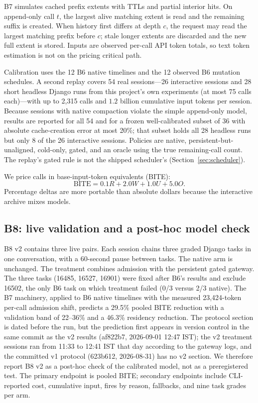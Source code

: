 \documentclass[10pt,twocolumn]{article}
\begin{document}
B7 simulates cached prefix extents with TTLs and partial interior hits.  On append-only call $t$, the
largest alive matching extent is read and the remaining suffix is created.  When history first differs
at depth $c$, the request may read the largest matching prefix before $c$; stale longer extents are
discarded and the new full extent is stored.  Inputs are observed per-call API token totals, so text
token estimation is not on the pricing critical path.

Calibration uses the 12 B6 native timelines and the 12 observed B6 mutation schedules.  A second
replay covers 54 real sessions---26 interactive sessions and 28 short headless Django runs from this
project's own experiments (at most 75 calls each)---with up to 2,315 calls and $1.2$ billion cumulative
input tokens per session.  Because sessions with native compaction violate the simple append-only model,
results are reported for all 54 and for a frozen well-calibrated subset of 36 with absolute
cache-creation error at most 20\%; that subset holds all 28 headless runs but only 8 of the 26
interactive sessions.  Policies are native, persistent-but-unaligned, cold-only, gated, and an oracle
using the true remaining-call count.  The replay's gated rule is not the shipped scheduler's
(Section~\ref{sec:scheduler}).

We price calls in base-input-token equivalents (BITE):
\begin{equation}
\mathrm{BITE}=0.1R+2.0W+1.0U+5.0O.
\end{equation}
Percentage deltas are more portable than absolute dollars because the interactive archive mixes
models.

\subsection{B8: live validation and a post-hoc model check}
\label{sec:b8method}

B8 v2 contains three live pairs.  Each session chains three graded Django tasks in one conversation,
with a 60-second pause between tasks.  The native arm is unchanged.  The treatment combines admission
with the persistent gated gateway.  The three tasks (16485, 16527, 16901) were fixed after B6's results
and exclude 16502, the only B6 task on which treatment failed (0/3 versus 2/3 native).  The B7
machinery, applied to B6 native timelines with the measured 23,424-token per-call admission shift,
predicts a 29.5\% pooled BITE reduction with a validation band of 22--36\% and a 46.3\% residency
reduction.  The protocol section is dated before the run, but the prediction first appears in version
control in the same commit as the v2 results (af822b7, 2026-09-01 12:47 IST); the v2 treatment
sessions ran from 11:33 to 12:41 IST that day according to the gateway logs, and the committed v1
protocol (623b612, 2026-08-31) has no v2 section.  We therefore report B8 v2 as a post-hoc check of the calibrated model,
not as a preregistered test.  The primary endpoint is pooled BITE; secondary endpoints include
CLI-reported cost, cumulative input, fires by reason, fallbacks, and nine task grades per arm.
\end{document}
